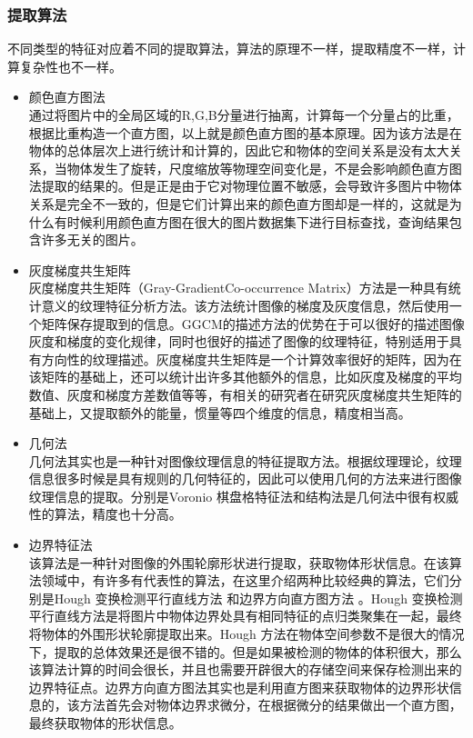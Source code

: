 \subsubsection{提取算法}
不同类型的特征对应着不同的提取算法，算法的原理不一样，提取精度不一样，计算复杂性也不一样。
\begin{itemize}
\item 颜色直方图法\\通过将图片中的全局区域的R,G,B分量进行抽离，计算每一个分量占的比重，根据比重构造一个直方图，以上就是颜色直方图的基本原理。因为该方法是在物体的总体层次上进行统计和计算的，因此它和物体的空间关系是没有太大关系，当物体发生了旋转，尺度缩放等物理空间变化是，不是会影响颜色直方图法提取的结果的。但是正是由于它对物理位置不敏感，会导致许多图片中物体关系是完全不一致的，但是它们计算出来的颜色直方图却是一样的，这就是为什么有时候利用颜色直方图在很大的图片数据集下进行目标查找，查询结果包含许多无关的图片。
\item 灰度梯度共生矩阵\\ 灰度梯度共生矩阵（Gray-GradientCo-occurrence Matrix）方法是一种具有统计意义的纹理特征分析方法。该方法统计图像的梯度及灰度信息，然后使用一个矩阵保存提取到的信息。GGCM的描述方法的优势在于可以很好的描述图像灰度和梯度的变化规律，同时也很好的描述了图像的纹理特征，特别适用于具有方向性的纹理描述。灰度梯度共生矩阵是一个计算效率很好的矩阵，因为在该矩阵的基础上，还可以统计出许多其他额外的信息，比如灰度及梯度的平均数值、灰度和梯度方差数值等等，有相关的研究者在研究灰度梯度共生矩阵的基础上，又提取额外的能量，惯量等四个维度的信息，精度相当高。
\item 几何法\\几何法其实也是一种针对图像纹理信息的特征提取方法。根据纹理理论，纹理信息很多时候是具有规则的几何特征的，因此可以使用几何的方法来进行图像纹理信息的提取。分别是Voronio 棋盘格特征法和结构法是几何法中很有权威性的算法，精度也十分高。
\item 边界特征法\\该算法是一种针对图像的外围轮廓形状进行提取，获取物体形状信息。在该算法领域中，有许多有代表性的算法，在这里介绍两种比较经典的算法，它们分别是Hough 变换检测平行直线方法 和边界方向直方图方法 。Hough 变换检测平行直线方法是将图片中物体边界处具有相同特征的点归类聚集在一起，最终将物体的外围形状轮廓提取出来。Hough 方法在物体空间参数不是很大的情况下，提取的总体效果还是很不错的。但是如果被检测的物体的体积很大，那么该算法计算的时间会很长，并且也需要开辟很大的存储空间来保存检测出来的边界特征点。边界方向直方图法其实也是利用直方图来获取物体的边界形状信息的，该方法首先会对物体边界求微分，在根据微分的结果做出一个直方图，最终获取物体的形状信息。

\end{itemize}
